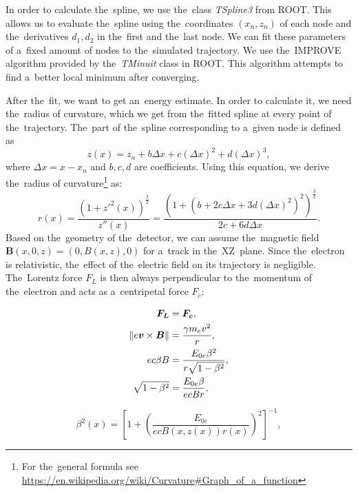 		In order to calculate the~spline, we use the~class \textit{TSpline3} from ROOT. This allows us to evaluate the~spline using the~coordinates $(x_n,z_n)$ of each node and the~derivatives $d_1,d_2$ in the~first and the~last node. We can fit these parameters of a~fixed amount of nodes to the~simulated trajectory. We use the~IMPROVE algorithm provided by the~\textit{TMinuit} class in ROOT. This algorithm attempts to find a~better local minimum after converging.
		
		After the~fit, we want to get an~energy estimate. In order to calculate it, we need the~radius of curvature, which we get from the~fitted spline at every point of the~trajectory. The~part of the~spline corresponding to a~given node is defined as
			\begin{equation}
				z(x) = z_n + b \Delta x+c(\Delta x)^2+d(\Delta x)^3,
			\end{equation}
		where $\Delta x = x-x_n$ and $b,c,d$ are coefficients. Using this equation, we derive the~radius of curvature\footnote{For the~general formula see \url{https://en.wikipedia.org/wiki/Curvature\#Graph_of_a_function}} as:
			\begin{equation}
				r(x) = \frac{\left(1+z'^2(x)\right)^\frac{3}{2}}{z''(x)} = \frac{\left(1+\left(b+2c\Delta x+3d(\Delta x)^2\right)^2\right)^\frac{3}{2}}{2c+6d\Delta x}.
			\end{equation}
		Based on the~geometry of the~detector, we can assume the~magnetic field \linebreak$\bm{B}(x,0,z) = (0,B(x,z),0)$ for a~track in the~XZ~plane. Since the~electron is relativistic, the~effect of the~electric field on its trajectory is negligible. The~Lorentz force $F_L$ is then always perpendicular to the~momentum of the~electron and acts as a~centripetal force $F_c$:
			\begin{linenomath}
			\begin{align}
				\bm{F_L} &= \bm{F_c},\\
				\norm{e\bm{v}\times\bm{B}} &= \frac{\gamma m_e v^2}{r},\\
				e c\beta B &= \frac{E_{0e} \beta^2}{r\sqrt{1-\beta^2}},\\
				\sqrt{1-\beta^2} &= \frac{E_{0e} \beta}{ecBr},
			\end{align}
			\end{linenomath}
			\begin{equation}
				\beta^2(x) = \left[1+\left(\frac{E_{0e}}{ecB(x,z(x))r(x)}\right)^2\right]^{-1}, \label{eq:ekin1}
			\end{equation}
